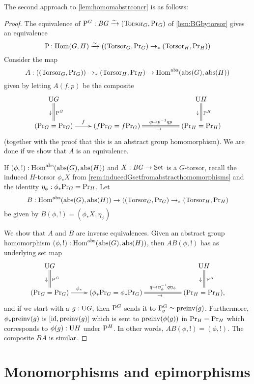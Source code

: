 \label{sec:absconctorsor}

The second approach to \cref{lem:homomabstrconcr} is as follows:


\begin{proof}
  The equivalence of $\mathrm{P}_{\!}^G:\mathit{B}\mathit{G}\xrightarrow{\sim}(\mathrm{Torsor}_G,\mathrm{Pr}_{{G}})$ of \cref{lem:BGbytorsor} gives an equivalence
$$\pathsp{}:\Hom(G,H)\we((\typetorsor_G,\princ G)\to_*(\typetorsor_H,\princ H))
$$
Consider the map
$$A:((\typetorsor_G,\princ G))\to_*(\typetorsor_H,\princ H)\to \Hom^\abstr(\abstr(G),\abstr(H))$$
given by letting $A(f,p)$ be the composite
$$\xymatrix{\USym G\ar@{=}[d]^{\pathsp{}^G}_\downarrow&&&
  \USym H\ar@{=}[d]^{\pathsp{}^H}_\downarrow\\
  (\princ G=\princ G)\ar[r]^-f&
  (f\princ G=f\princ G)\ar@{=}[rr]^-{q\mapsto p^{-1}qp}_\to&&
  (\princ H=\princ H)
}$$
(together with the proof that this is an abstract group homomorphism).  We
are done if we show that $A$ is an equivalence.

If $(\phi,!):\Hom^\abstr(\abstr(G),\abstr(H))$ and $X:\mathit{B}\mathit{G}\to\mathrm{Set}$ is a $G$-torsor, recall the induced $H$-torsor $\phi_*X$ from \cref{rem:inducedGsetfromabstracthomomorphisms} and the identity $\eta_\phi:\phi_*\mathrm{Pr}_{{G}}=\mathrm{Pr}_{{H}}$.
Let
$$B: \Hom^\abstr(\abstr(G),\abstr(H))\to ((\typetorsor_G,\princ G)\to_*(\typetorsor_H,\princ H)$$
be given by $B(\phi,!)=(\phi_*X,\eta_\phi)$

We show that $A$ and $B$ are inverse equivalences.  Given an abstract group homomorphism $(\phi,!):\Hom^\abstr(\abstr(G),\abstr(H))$, then $AB(\phi,!)$ has as underlying set map
$$\xymatrix{\USym G\ar@{=}[d]^{\pathsp{}^G}_\downarrow&&&
  \USym H\ar@{=}[d]^{\pathsp{}^H}_\downarrow\\
  (\princ G=\princ G)\ar[r]^-{\phi_*}&
  (\phi_*\princ G=\phi_*\princ G)\ar@{=}[rr]^-{q\mapsto \eta_\phi^{-1}q\eta_\phi}_\to&&
  (\princ H=\princ H),
}$$
and if we start with a $g:\mathrm{U} G$, then $\mathrm{P}_{\!}^G$ sends it to $\pathsp g^G\oldequiv\preinv (g)$.  Furthermore, $\phi_*\mathrm{preinv} (g)$ is $[\mathord{\mathrm{id}},\mathrm{preinv} (g)]$ which is sent to $\mathrm{preinv} (\phi(g))$ in $\mathrm{Pr}_{{H}}=\mathrm{Pr}_{{H}}$ which corresponds to $\phi(g):\mathrm{U} H$ under $\mathrm{P}_{\!}^H$.  In other words, $AB(\phi,!)=(\phi,!)$.  The composite $BA$ is similar.
\end{proof}


\section{Monomorphisms and epimorphisms}
\label{sec:monoepi}


